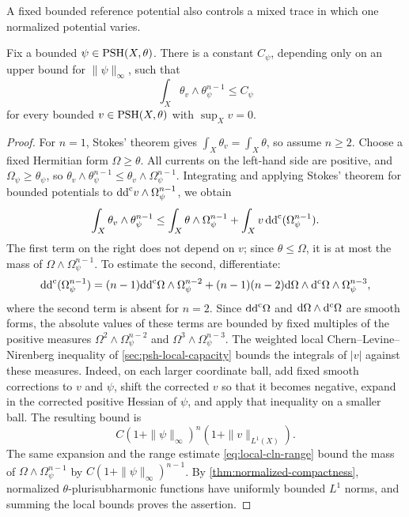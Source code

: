 A fixed bounded reference potential also controls a mixed trace in which one normalized potential varies.

\begin{lemma}\label{lem:bounded-reference-trace}
Fix a bounded $\psi\in\mathrm{PSH}(X,\theta)$. There is a constant $C_\psi$, depending only on an upper bound for $\|\psi\|_\infty$, such that
\[
 \int_X\theta_v\wedge\theta_\psi^{n-1}\leq C_\psi
\]
for every bounded $v\in\mathrm{PSH}(X,\theta)$ with $\sup_Xv=0$.
\end{lemma}
\begin{proof}
For $n=1$, Stokes' theorem gives $\int_X\theta_v=\int_X\theta$, so assume $n\geq2$. Choose a fixed Hermitian form $\Omega\geq\theta$. All currents on the left-hand side are positive, and $\Omega_\psi\geq\theta_\psi$, so $\theta_v\wedge\theta_\psi^{n-1}\leq\theta_v\wedge\Omega_\psi^{n-1}$. Integrating and applying Stokes' theorem for bounded potentials to $\mathrm{dd}^{\mathrm{c}} v\wedge\Omega_\psi^{n-1}$, we obtain
\[
 \int_X\theta_v\wedge\theta_\psi^{n-1}
 \leq\int_X\theta\wedge\Omega_\psi^{n-1}
       +\int_Xv\,\mathrm{dd}^{\mathrm{c}}(\Omega_\psi^{n-1}).
\]
The first term on the right does not depend on $v$; since $\theta\leq\Omega$, it is at most the mass of $\Omega\wedge\Omega_\psi^{n-1}$. To estimate the second, differentiate:
\[
 \mathrm{dd}^{\mathrm{c}}(\Omega_\psi^{n-1})
 =(n-1)\mathrm{dd}^{\mathrm{c}}\Omega\wedge\Omega_\psi^{n-2}
 +(n-1)(n-2)\mathrm{d}\Omega\wedge\mathrm d^{\mathrm c}\Omega\wedge\Omega_\psi^{n-3},
\]
where the second term is absent for $n=2$. Since $\mathrm{dd}^{\mathrm{c}}\Omega$ and $\mathrm d\Omega\wedge\mathrm d^{\mathrm c}\Omega$ are smooth forms, the absolute values of these terms are bounded by fixed multiples of the positive measures $\Omega^2\wedge\Omega_\psi^{n-2}$ and $\Omega^3\wedge\Omega_\psi^{n-3}$. The weighted local Chern--Levine--Nirenberg inequality of \cref{sec:psh-local-capacity} bounds the integrals of $|v|$ against these measures. Indeed, on each larger coordinate ball, add fixed smooth corrections to $v$ and $\psi$, shift the corrected $v$ so that it becomes negative, expand in the corrected positive Hessian of $\psi$, and apply that inequality on a smaller ball. The resulting bound is
\[
 C(1+\|\psi\|_\infty)^n(1+\|v\|_{L^1(X)}).
\]
The same expansion and the range estimate \eqref{eq:local-cln-range} bound the mass of $\Omega\wedge\Omega_\psi^{n-1}$ by $C(1+\|\psi\|_\infty)^{n-1}$. By \cref{thm:normalized-compactness}, normalized $\theta$-plurisubharmonic functions have uniformly bounded $L^1$ norms, and summing the local bounds proves the assertion.
\end{proof}

